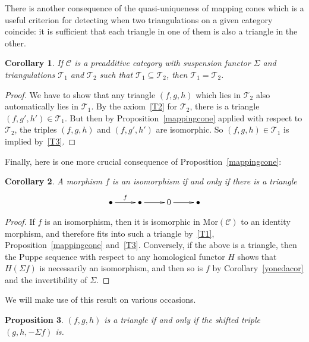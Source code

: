 \documentclass{amsproc}
\newtheorem{prop}{Proposition}[section]
\newtheorem{cor}[prop]{Corollary}
\theoremstyle{definition}
\begin{document}
There is another consequence of the quasi-uniqueness of mapping cones which is a useful criterion for detecting when two triangulations on a given category coincide: it is sufficient that each triangle in one of them is also a triangle in the other. 

\begin{cor}
\label{triangscoincide}
If ${\mathcal{C}}$ is a preadditive category with suspension functor $\Sigma$ and triangulations $\mathcal{T}_1$ and $\mathcal{T}_2$ such that $\mathcal{T}_1\subseteq\mathcal{T}_2$, then $\mathcal{T}_1=\mathcal{T}_2$.
\end{cor}

\begin{proof}
We have to show that any triangle $(f,g,h)$ which lies in $\mathcal{T}_2$ also automatically lies in $\mathcal{T}_1$. By the axiom~\ref{T2} for $\mathcal{T}_2$, there is a triangle $(f,g',h')\in\mathcal{T}_1$. But then by Proposition~\ref{mappingcone} applied with respect to $\mathcal{T}_2$, the triples $(f,g,h)$ and $(f,g',h')$ are isomorphic. So $(f,g,h)\in\mathcal{T}_1$ is implied by~\ref{T3}.
\end{proof}

Finally, here is one more crucial consequence of Proposition~\ref{mappingcone}:

\begin{cor}
\label{iso}
A morphism $f$ is an isomorphism if and only if there is a triangle
\begin{displaymath}
\xymatrix{{\bullet}\ar[r]^f & {\bullet}\ar[r] & 0\ar[r] & {\bullet}}
\end{displaymath}
\end{cor}

\begin{proof}
If $f$ is an isomorphism, then it is isomorphic in ${\mathrm{Mor}}({\mathcal{C}})$ to an identity morphism, and therefore fits into such a triangle by~\ref{T1}, Proposition~\ref{mappingcone} and~\ref{T3}. Conversely, if the above is a triangle, then the Puppe sequence with respect to any homological functor $H$ shows that $H(\Sigma f)$ is necessarily an isomorphism, and then so is $f$ by Corollary~\ref{yonedacor} and the invertibility of $\Sigma$.
\end{proof}

We will make use of this result on various occasions.

\begin{prop}
\label{shift}
$(f,g,h)$ is a triangle if and only if the shifted triple $(g,h,-\Sigma f)$ is.
\end{prop}
\end{document}
